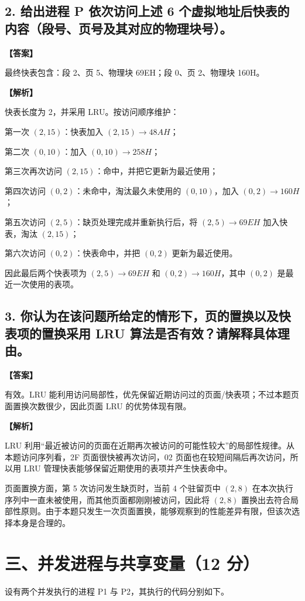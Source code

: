 \documentclass[UTF8,12pt]{ctexart}
\newenvironment{explanation}{\par\noindent\textbf{【解析】}\par\smallskip}{\par\medskip}
\newenvironment{answer}{\par\noindent\textbf{【答案】}\par\smallskip}{\par}
\begin{document}
\subsection*{2. 给出进程 P 依次访问上述 6 个虚拟地址后快表的内容（段号、页号及其对应的物理块号）。}
\begin{answer}
最终快表包含：段 2、页 5、物理块 69EH；段 0、页 2、物理块 160H。
\end{answer}

\begin{explanation}
快表长度为 2，并采用 LRU。按访问顺序维护：

第一次 $(2,15)$：快表加入 $(2,15)\to48AH$；

第二次 $(0,10)$：加入 $(0,10)\to258H$；

第三次再次访问 $(2,15)$：命中，并把它更新为最近使用；

第四次访问 $(0,2)$：未命中，淘汰最久未使用的 $(0,10)$，加入 $(0,2)\to160H$；

第五次访问 $(2,5)$：缺页处理完成并重新执行后，将 $(2,5)\to69EH$ 加入快表，淘汰 $(2,15)$；

第六次访问 $(0,2)$：快表命中，并把 $(0,2)$ 更新为最近使用。

因此最后两个快表项为 $(2,5)\to69EH$ 和 $(0,2)\to160H$，其中 $(0,2)$ 是最近一次使用的表项。
\end{explanation}
\subsection*{3. 你认为在该问题所给定的情形下，页的置换以及快表项的置换采用 LRU 算法是否有效？请解释具体理由。}
\begin{answer}
有效。LRU 能利用访问局部性，优先保留近期访问过的页面/快表项；不过本题页面置换次数很少，因此页面 LRU 的优势体现有限。
\end{answer}

\begin{explanation}
LRU 利用“最近被访问的页面在近期再次被访问的可能性较大”的局部性规律。从本题访问序列看，2F 页面很快被再次访问，02 页面也在较短间隔后再次访问，所以用 LRU 管理快表能够保留近期使用的表项并产生快表命中。

页面置换方面，第 5 次访问发生缺页时，当前 4 个驻留页中 $(2,8)$ 在本次执行序列中一直未被使用，而其他页面都刚刚被访问，因此将 $(2,8)$ 置换出去符合局部性原则。由于本题只发生一次页面置换，能够观察到的性能差异有限，但该次选择本身是合理的。
\end{explanation}
\section*{三、并发进程与共享变量（12 分）}
设有两个并发执行的进程 P1 与 P2，其执行的代码分别如下。
\end{document}
